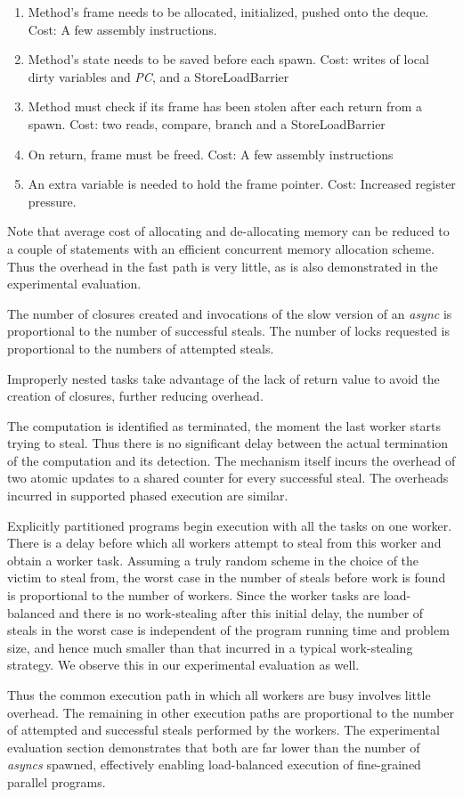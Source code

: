 \begin{enumerate}
\item Method's frame needs to be allocated, initialized, pushed onto
  the deque. Cost: A few assembly instructions.
\item Method's state needs to be saved before each spawn. Cost: writes
  of local dirty variables and {\em PC}, and a {\java
  StoreLoadBarrier}
\item Method must check if its frame has been stolen after each
  return from a spawn. Cost: two reads, compare, branch and a 
  {\java StoreLoadBarrier} 
\item On return, frame must be freed. Cost: A few assembly instructions
\item An extra variable is needed to hold the frame pointer. Cost: Increased
  register pressure.
\end{enumerate}

Note that average cost of allocating and de-allocating memory can be
reduced to a couple of statements with an efficient concurrent memory
allocation scheme. Thus the overhead in the fast path is very
little, as is also demonstrated in the experimental evaluation.

The number of closures created and invocations of the slow version of
an \emph{async} is proportional to the number of successful steals. The
number of locks requested is proportional to the numbers of attempted
steals. 

Improperly nested tasks take advantage of the lack of return value to
avoid the creation of closures, further reducing overhead. 

The computation is identified as terminated, the moment the last
worker starts trying to steal. Thus there is no significant delay
between the actual termination of the computation and its detection.
The mechanism itself incurs the overhead of two atomic updates to a
shared counter for every successful steal. The overheads incurred in
supported phased execution are similar.

Explicitly partitioned programs begin execution with all the tasks on
one worker. There is a delay before which all workers attempt to steal
from this worker and obtain a worker task. Assuming a truly random
scheme in the choice of the victim to steal from, the worst case in
the number of steals before work is found is proportional to the
number of workers. Since the worker tasks are load-balanced and there
is no work-stealing after this initial delay, the number of steals in
the worst case is independent of the program running time and problem
size, and hence much smaller than that incurred in a typical
work-stealing strategy. We observe this in our experimental evaluation
as well. 


Thus the common execution path in which all workers are busy involves
little overhead. The remaining in other execution paths are
proportional to the number of attempted and successful steals
performed by the workers. The experimental evaluation section
demonstrates that both are far lower than the number of \emph{asyncs}
spawned, effectively enabling load-balanced execution of fine-grained
parallel programs.


